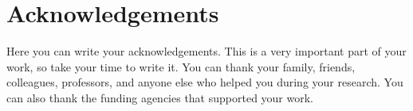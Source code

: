 \chapter*{Acknowledgements}
Here you can write your acknowledgements. This is a very important part of your work, so take your time to write it. You can thank your family, friends, colleagues, professors, and anyone else who helped you during your research. You can also thank the funding agencies that supported your work.